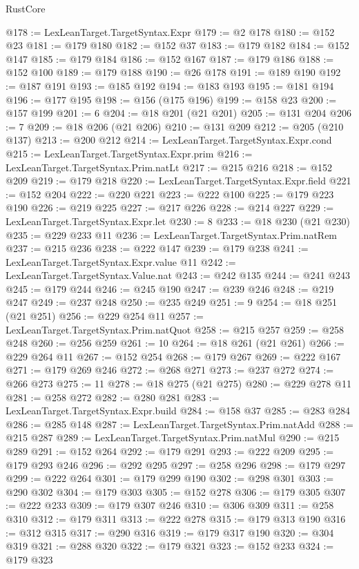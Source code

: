 \begin{lexlean}{RustCore}
\begin{coremodule}
@178 := LexLeanTarget.TargetSyntax.Expr
@179 := @2 @178
@180 := @152 @23
@181 := @179 @180
@182 := @152 @37
@183 := @179 @182
@184 := @152 @147
@185 := @179 @184
@186 := @152 @167
@187 := @179 @186
@188 := @152 @100
@189 := @179 @188
@190 := @26 @178
@191 := @189 @190
@192 := @187 @191
@193 := @185 @192
@194 := @183 @193
@195 := @181 @194
@196 := @177 @195
@198 := @156 (@175 @196)
@199 := @158 @23
@200 := @157 @199
@201 := 6
@204 := @18 @201 (@21 @201)
@205 := @131 @204
@206 := 7
@209 := @18 @206 (@21 @206)
@210 := @131 @209
@212 := @205 (@210 @137)
@213 := @200 @212
@214 := LexLeanTarget.TargetSyntax.Expr.cond
@215 := LexLeanTarget.TargetSyntax.Expr.prim
@216 := LexLeanTarget.TargetSyntax.Prim.natLt
@217 := @215 @216
@218 := @152 @209
@219 := @179 @218
@220 := LexLeanTarget.TargetSyntax.Expr.field
@221 := @152 @204
@222 := @220 @221
@223 := @222 @100
@225 := @179 @223 @190
@226 := @219 @225
@227 := @217 @226
@228 := @214 @227
@229 := LexLeanTarget.TargetSyntax.Expr.let
@230 := 8
@233 := @18 @230 (@21 @230)
@235 := @229 @233 @11
@236 := LexLeanTarget.TargetSyntax.Prim.natRem
@237 := @215 @236
@238 := @222 @147
@239 := @179 @238
@241 := LexLeanTarget.TargetSyntax.Expr.value @11
@242 := LexLeanTarget.TargetSyntax.Value.nat
@243 := @242 @135
@244 := @241 @243
@245 := @179 @244
@246 := @245 @190
@247 := @239 @246
@248 := @219 @247
@249 := @237 @248
@250 := @235 @249
@251 := 9
@254 := @18 @251 (@21 @251)
@256 := @229 @254 @11
@257 := LexLeanTarget.TargetSyntax.Prim.natQuot
@258 := @215 @257
@259 := @258 @248
@260 := @256 @259
@261 := 10
@264 := @18 @261 (@21 @261)
@266 := @229 @264 @11
@267 := @152 @254
@268 := @179 @267
@269 := @222 @167
@271 := @179 @269 @246
@272 := @268 @271
@273 := @237 @272
@274 := @266 @273
@275 := 11
@278 := @18 @275 (@21 @275)
@280 := @229 @278 @11
@281 := @258 @272
@282 := @280 @281
@283 := LexLeanTarget.TargetSyntax.Expr.build
@284 := @158 @37
@285 := @283 @284
@286 := @285 @148
@287 := LexLeanTarget.TargetSyntax.Prim.natAdd
@288 := @215 @287
@289 := LexLeanTarget.TargetSyntax.Prim.natMul
@290 := @215 @289
@291 := @152 @264
@292 := @179 @291
@293 := @222 @209
@295 := @179 @293 @246
@296 := @292 @295
@297 := @258 @296
@298 := @179 @297
@299 := @222 @264
@301 := @179 @299 @190
@302 := @298 @301
@303 := @290 @302
@304 := @179 @303
@305 := @152 @278
@306 := @179 @305
@307 := @222 @233
@309 := @179 @307 @246
@310 := @306 @309
@311 := @258 @310
@312 := @179 @311
@313 := @222 @278
@315 := @179 @313 @190
@316 := @312 @315
@317 := @290 @316
@319 := @179 @317 @190
@320 := @304 @319
@321 := @288 @320
@322 := @179 @321
@323 := @152 @233
@324 := @179 @323

\end{coremodule}
\end{lexlean}
